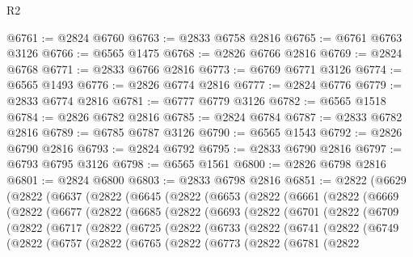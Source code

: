 \begin{lexlean}{R2}
\begin{coremodule}
@6761 := @2824 @6760
@6763 := @2833 @6758 @2816
@6765 := @6761 @6763 @3126
@6766 := @6565 @1475
@6768 := @2826 @6766 @2816
@6769 := @2824 @6768
@6771 := @2833 @6766 @2816
@6773 := @6769 @6771 @3126
@6774 := @6565 @1493
@6776 := @2826 @6774 @2816
@6777 := @2824 @6776
@6779 := @2833 @6774 @2816
@6781 := @6777 @6779 @3126
@6782 := @6565 @1518
@6784 := @2826 @6782 @2816
@6785 := @2824 @6784
@6787 := @2833 @6782 @2816
@6789 := @6785 @6787 @3126
@6790 := @6565 @1543
@6792 := @2826 @6790 @2816
@6793 := @2824 @6792
@6795 := @2833 @6790 @2816
@6797 := @6793 @6795 @3126
@6798 := @6565 @1561
@6800 := @2826 @6798 @2816
@6801 := @2824 @6800
@6803 := @2833 @6798 @2816
@6851 := @2822
    (@6629
      (@2822
        (@6637
          (@2822
            (@6645
              (@2822
                (@6653
                  (@2822
                    (@6661
                      (@2822
                        (@6669
                          (@2822
                            (@6677
                              (@2822
                                (@6685
                                  (@2822
                                    (@6693
                                      (@2822
                                        (@6701
                                          (@2822
                                            (@6709
                                              (@2822
                                                (@6717
                                                  (@2822
                                                    (@6725
                                                      (@2822
                                                        (@6733
                                                          (@2822
                                                            (@6741
                                                              (@2822
                                                                (@6749
                                                                  (@2822
                                                                    (@6757
                                                                      (@2822
                                                                        (@6765
                                                                          (@2822
                                                                            (@6773
                                                                              (@2822
                                                                                (@6781
                                                                                  (@2822

\end{coremodule}
\end{lexlean}
